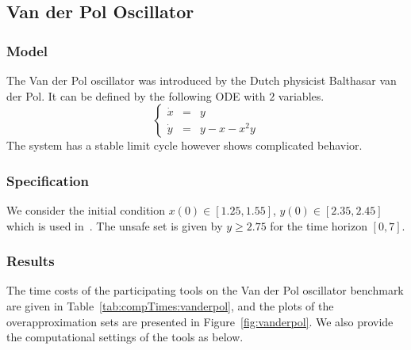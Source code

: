 \documentclass[EPiC]{easychair}
\begin{document}
\subsection{Van der Pol Oscillator}

\subsubsection{Model}

The Van der Pol oscillator was introduced by the Dutch physicist Balthasar van der Pol. It can be defined by the following ODE with $2$ variables.
\[
 \left\{
 \begin{array}{lcl}
  \dot{x} & = & y \\
  \dot{y} & = & y - x - x^2 y
 \end{array}
 \right.
\]
The system has a stable limit cycle however shows complicated behavior.

\subsubsection{Specification}

We consider the initial condition $x(0)\in [1.25,1.55]$, $y(0) \in [2.35,2.45]$ which is used in~\cite{Althoff/2010/phd}. The unsafe set is given by $y \geq 2.75$ for the time horizon $[0,7]$.


\subsubsection{Results}

The time costs of the participating tools on the Van der Pol oscillator benchmark are given in Table~\ref{tab:compTimes:vanderpol}, and the plots of the overapproximation sets are presented in Figure~\ref{fig:vanderpol}. We also provide the computational settings of the tools as below.
\end{document}
